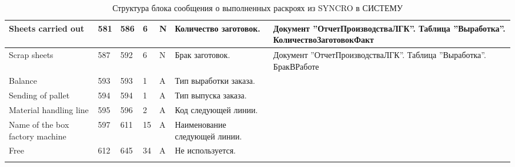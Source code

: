 \begin{landscape}
\begin{longtable}{|p{45mm}|p{6mm}|p{6mm}|p{8mm}|p{6mm}|p{70mm}|p{80mm}|}
\hline
\parbox[c][10mm]{45mm}{Sheets carried out} & \parbox{9mm}{581} & \parbox{9mm}{586} & \parbox{11mm}{6} & \parbox{10mm}{N} & \parbox{70mm}{Количество заготовок.} & \parbox{80mm}{Документ ''ОтчетПроизводстваЛГК''. Таблица ''Выработка''. КоличествоЗаготовокФакт} \\
\hline
\parbox[c][10mm]{45mm}{Scrap sheets} & \parbox{9mm}{587} & \parbox{9mm}{592} & \parbox{11mm}{6} & \parbox{10mm}{N} & \parbox{70mm}{Брак заготовок.} & \parbox{80mm}{Документ ''ОтчетПроизводстваЛГК''. Таблица ''Выработка''. БракВРаботе} \\
\hline
\parbox[c][10mm]{45mm}{Balance} & \parbox{9mm}{593} & \parbox{9mm}{593} & \parbox{11mm}{1} & \parbox{10mm}{A} & \parbox{70mm}{Тип выработки заказа.} & \parbox{80mm}{} \\
\hline
\parbox[c][10mm]{45mm}{Sending of pallet} & \parbox{9mm}{594} & \parbox{9mm}{594} & \parbox{11mm}{1} & \parbox{10mm}{A} & \parbox{70mm}{Тип выпуска заказа.} & \parbox{80mm}{} \\
\hline
\parbox[c][10mm]{45mm}{Material handling line} & \parbox{9mm}{595} & \parbox{9mm}{596} & \parbox{11mm}{2} & \parbox{10mm}{A} & \parbox{70mm}{Код следующей линии.} & \parbox{80mm}{} \\
\hline
\parbox[c][10mm]{45mm}{Name of the box factory machine} & \parbox{9mm}{597} & \parbox{9mm}{611} & \parbox{11mm}{15} & \parbox{10mm}{A} & \parbox{70mm}{Наименование следующей линии.} & \parbox{80mm}{} \\
\hline
\parbox[c][10mm]{45mm}{Free} & \parbox{9mm}{612} & \parbox{9mm}{645} & \parbox{11mm}{34} & \parbox{10mm}{A} & \parbox{70mm}{Не используется.} & \parbox{80mm}{} \\
\hline

\caption{Структура блока сообщения о выполненных раскроях из SYNCRO в СИСТЕМУ}\label{tab:fosber_completed}
\end{longtable}  
\normalsize

\end{landscape} 
\normalsize


